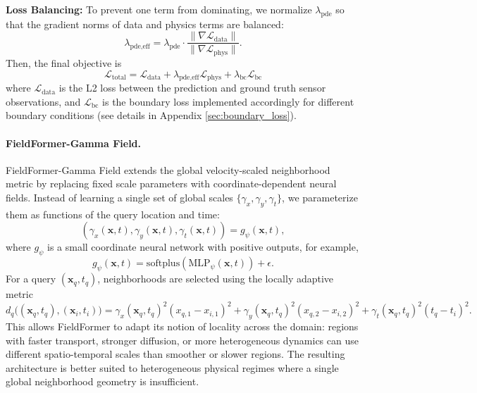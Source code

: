 \noindent\textbf{Loss Balancing:}  
To prevent one term from dominating, we normalize $\lambda_{\text{pde}}$ so that the gradient norms of data and physics terms are balanced:
\[
\lambda_{\text{pde,eff}} = \lambda_{\text{pde}} \cdot 
\frac{\|\nabla \mathcal{L}_{\text{data}}\|}{\|\nabla \mathcal{L}_{\text{phys}}\|}.
\]
Then, the final objective is
\[
\mathcal{L}_{\text{total}} = \mathcal{L}_{\text{data}} + \lambda_{\text{pde,eff}} \mathcal{L}_{\text{phys}} + \lambda_{\text{bc}} \mathcal{L}_{\text{bc}}
\]
where $\mathcal{L}_{\text{data}}$ is the L2 loss between the prediction and ground truth sensor observations, and $\mathcal{L}_{\text{bc}}$ is the boundary loss implemented accordingly for different boundary conditions (see details in Appendix \ref{sec:boundary_loss}).

\paragraph{FieldFormer-Gamma Field.}
FieldFormer-Gamma Field extends the global velocity-scaled neighborhood metric by replacing fixed scale parameters with coordinate-dependent neural fields. Instead of learning a single set of global scales $\{\gamma_x,\gamma_y,\gamma_t\}$, we parameterize them as functions of the query location and time:
\[
(\gamma_x(\mathbf{x},t),\gamma_y(\mathbf{x},t),\gamma_t(\mathbf{x},t))
=
g_\psi(\mathbf{x},t),
\]
where $g_\psi$ is a small coordinate neural network with positive outputs, for example,
\[
g_\psi(\mathbf{x},t)
=
\mathrm{softplus}(\mathrm{MLP}_\psi(\mathbf{x},t))+\epsilon.
\]
For a query $(\mathbf{x}_q,t_q)$, neighborhoods are selected using the locally adaptive metric
\[
d_q\big((\mathbf{x}_q,t_q),(\mathbf{x}_i,t_i)\big)
=
\gamma_x(\mathbf{x}_q,t_q)^2(x_{q,1}-x_{i,1})^2
+
\gamma_y(\mathbf{x}_q,t_q)^2(x_{q,2}-x_{i,2})^2
+
\gamma_t(\mathbf{x}_q,t_q)^2(t_q-t_i)^2 .
\]
This allows FieldFormer to adapt its notion of locality across the domain: regions with faster transport, stronger diffusion, or more heterogeneous dynamics can use different spatio-temporal scales than smoother or slower regions. The resulting architecture is better suited to heterogeneous physical regimes where a single global neighborhood geometry is insufficient.

